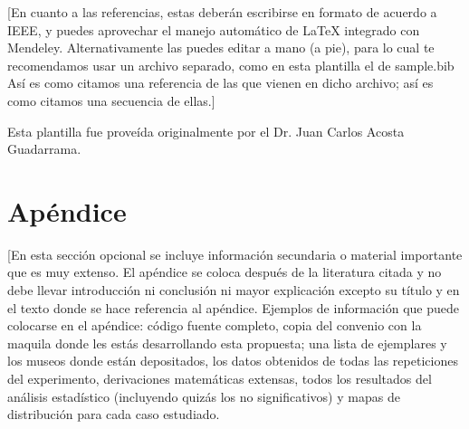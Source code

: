 \documentclass[final,12pt]{article}
\begin{document}
[En cuanto a las referencias, estas deberán escribirse en formato de acuerdo a IEEE, y puedes aprovechar el manejo automático de \LaTeX\xspace integrado con Mendeley. Alternativamente las puedes editar a mano (a pie), para lo cual te recomendamos usar un archivo separado, como en esta plantilla el de sample.bib
Así \cite{Van-Dongen12} es como citamos una referencia de las que vienen en dicho archivo; así \cite{Mittelbach04} es como citamos una secuencia de ellas.]

Esta plantilla fue proveída originalmente por el Dr. Juan Carlos Acosta Guadarrama.






\clearpage
\appendix


\section{Apéndice}
[En esta sección opcional se incluye información secundaria o material importante que es muy extenso. El apéndice se coloca después de la literatura citada y no debe llevar introducción ni conclusión ni mayor explicación excepto su título y en el texto donde se hace referencia al apéndice. 
Ejemplos de información que puede colocarse en el apéndice: código fuente completo, copia del  convenio con la maquila donde les estás desarrollando esta propuesta; una lista de ejemplares y los museos donde están depositados, los datos obtenidos de todas las repeticiones del experimento, derivaciones matemáticas extensas, todos los resultados del análisis estadístico (incluyendo quizás los no significativos) y mapas de distribución para cada caso estudiado. 
\end{document}
